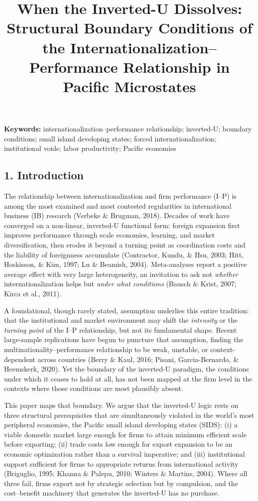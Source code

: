 \documentclass[
  12pt,a4paper]{article}
\title{When the Inverted-U Dissolves: Structural Boundary Conditions of
the Internationalization--Performance Relationship in Pacific
Microstates}
\author{}
\date{}
\begin{document}
\maketitle

\textbf{Keywords:} internationalization--performance relationship;
inverted-U; boundary conditions; small island developing states; forced
internationalization; institutional voids; labor productivity; Pacific
economies

\hypertarget{introduction}{%
\subsection{1. Introduction}\label{introduction}}

The relationship between internationalization and firm performance
(I--P) is among the most examined and most contested regularities in
international business (IB) research (Verbeke \& Brugman, 2018). Decades
of work have converged on a non-linear, inverted-U functional form:
foreign expansion first improves performance through scale economies,
learning, and market diversification, then erodes it beyond a turning
point as coordination costs and the liability of foreignness accumulate
(Contractor, Kundu, \& Hsu, 2003; Hitt, Hoskisson, \& Kim, 1997; Lu \&
Beamish, 2004). Meta-analyses report a positive average effect with very
large heterogeneity, an invitation to ask not \emph{whether}
internationalization helps but \emph{under what conditions} (Bausch \&
Krist, 2007; Kirca et al., 2011).

A foundational, though rarely stated, assumption underlies this entire
tradition: that the institutional and market environment may shift the
\emph{intensity} or the \emph{turning point} of the I--P relationship,
but not its fundamental shape. Recent large-sample replications have
begun to puncture that assumption, finding the
multinationality--performance relationship to be weak, unstable, or
context-dependent across countries (Berry \& Kaul, 2016; Pisani,
Garcia-Bernardo, \& Heemskerk, 2020). Yet the boundary of the inverted-U
paradigm, the conditions under which it ceases to hold at all, has not
been mapped at the firm level in the contexts where those conditions are
most plausibly absent.

This paper maps that boundary. We argue that the inverted-U logic rests
on three structural prerequisites that are simultaneously violated in
the world's most peripheral economies, the Pacific small island
developing states (SIDS): (i) a viable domestic market large enough for
firms to attain minimum efficient scale before exporting; (ii) trade
costs low enough for export expansion to be an economic optimization
rather than a survival imperative; and (iii) institutional support
sufficient for firms to appropriate returns from international activity
(Briguglio, 1995; Khanna \& Palepu, 2010; Winters \& Martins, 2004).
Where all three fail, firms export not by strategic selection but by
compulsion, and the cost--benefit machinery that generates the
inverted-U has no purchase.
\end{document}
